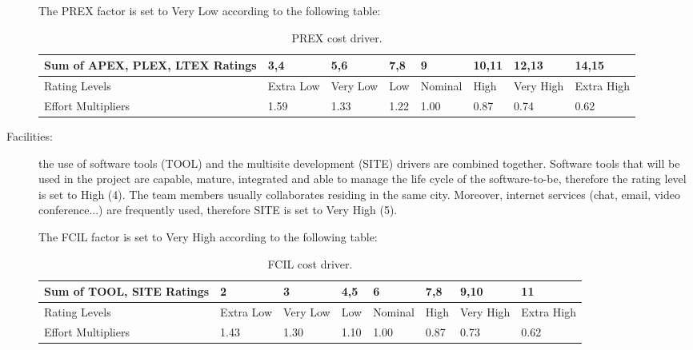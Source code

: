 \begin{description}
The PREX factor is set to Very Low according to the following table:

\begin{table}[H]
	\begin{adjustwidth}{-.5in}{-.5in}
    \centering
    \begin{tabular}{p{4cm}|p{1cm}|p{1cm}|p{1cm}|p{1.5cm}|p{1cm}|p{1cm}|p{1cm}}
        \hline
        Sum of APEX, PLEX, LTEX Ratings & 3,4 & 5,6 & 7,8 & 9 & 10,11 & 12,13 & 14,15 \\
        \hline
        \hline
        Rating Levels & Extra Low & Very Low & Low & Nominal & High & Very High & Extra High \\
        \hline
        Effort Multipliers & 1.59 & 1.33 & 1.22 & 1.00 & 0.87 & 0.74 & 0.62 \\
        \hline
    \end{tabular}
    \caption{PREX cost driver.}
    \end{adjustwidth}
\end{table}

\item[Facilities:] the use of software tools (TOOL) and the multisite development (SITE) drivers are combined together. Software tools that will be used in the project are capable, mature, integrated and able to manage the life cycle of the software-to-be, therefore the rating level is set to High (4). The team members usually collaborates residing in the same city. Moreover, internet services (chat, email, video conference...) are frequently used, therefore SITE is set to Very High (5).

The FCIL factor is set to Very High according to the following table:

\begin{table}[H]
	\begin{adjustwidth}{-.5in}{-.5in}
    \centering
    \begin{tabular}{p{4cm}|p{1cm}|p{1cm}|p{1cm}|p{1.5cm}|p{1cm}|p{1cm}|p{1cm}}
        \hline
        Sum of TOOL, SITE Ratings & 2 & 3 & 4,5 & 6 & 7,8 & 9,10 & 11 \\
        \hline
        \hline
        Rating Levels & Extra Low & Very Low & Low & Nominal & High & Very High & Extra High \\
        \hline
        Effort Multipliers & 1.43 & 1.30 & 1.10 & 1.00 & 0.87 & 0.73 & 0.62 \\
        \hline
    \end{tabular}
    \caption{FCIL cost driver.}
    \end{adjustwidth}
\end{table}


\end{description}
